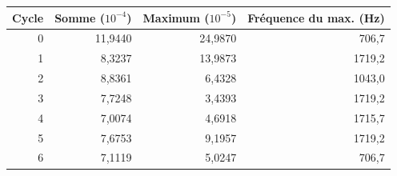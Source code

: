 \begin{tabular}{rrrr}
\toprule Cycle & Somme ($10^{-4}$) & Maximum ($10^{-5}$) & Fréquence du max. (Hz)\\
\midrule
0 & 11,9440 & 24,9870 & 706,7\\
1 & 8,3237 & 13,9873 & 1719,2\\
2 & 8,8361 & 6,4328 & 1043,0\\
3 & 7,7248 & 3,4393 & 1719,2\\
4 & 7,0074 & 4,6918 & 1715,7\\
5 & 7,6753 & 9,1957 & 1719,2\\
6 & 7,1119 & 5,0247 & 706,7\\
\bottomrule
\end{tabular}